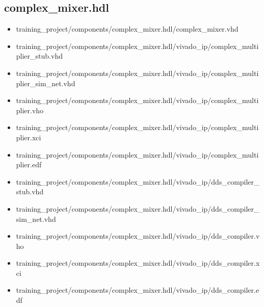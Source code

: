 \documentclass{article}
\def\comp{complex\_mixer}
\begin{document}
\subsection*{\comp.hdl}
	\begin{itemize}
		\item training\_project/components/complex\_mixer.hdl/complex\_mixer.vhd
		\item
training\_project/components/complex\_mixer.hdl/vivado\_ip/complex\_multiplier\_stub.vhd
		\item
training\_project/components/complex\_mixer.hdl/vivado\_ip/complex\_multiplier\_sim\_net.vhd
		\item
training\_project/components/complex\_mixer.hdl/vivado\_ip/complex\_multiplier.vho
		\item
training\_project/components/complex\_mixer.hdl/vivado\_ip/complex\_multiplier.xci
		\item
training\_project/components/complex\_mixer.hdl/vivado\_ip/complex\_multiplier.edf
		\item training\_project/components/complex\_mixer.hdl/vivado\_ip/dds\_compiler\_stub.vhd
		\item training\_project/components/complex\_mixer.hdl/vivado\_ip/dds\_compiler\_sim\_net.vhd
		\item
training\_project/components/complex\_mixer.hdl/vivado\_ip/dds\_compiler.vho
		\item
training\_project/components/complex\_mixer.hdl/vivado\_ip/dds\_compiler.xci
		\item
training\_project/components/complex\_mixer.hdl/vivado\_ip/dds\_compiler.edf
	\end{itemize}
\end{document}

